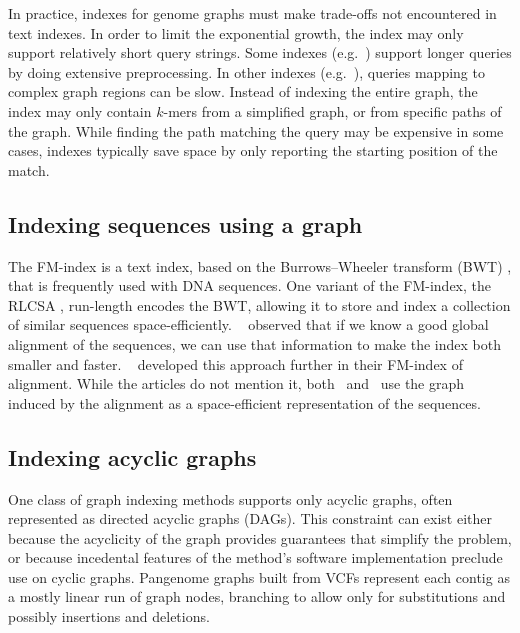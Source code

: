 In practice, indexes for genome graphs must make trade-offs not encountered in text indexes.
In order to limit the exponential growth, the index may only support relatively short query strings.
Some indexes (e.g.\ \cite{Siren_2014}) support longer queries by doing extensive preprocessing.
In other indexes (e.g.\ \cite{Thachuk_2013,Huang_2013,Maciuca_2016}), queries mapping to complex graph regions can be slow.
Instead of indexing the entire graph, the index may only contain $k$-mers from a simplified graph, or from specific paths of the graph.
While finding the path matching the query may be expensive in some cases, indexes typically save space by only reporting the starting position of the match.

\subsection{Indexing sequences using a graph}

The FM-index \cite{Ferragina_2005} is a text index, based on the Burrows--Wheeler transform (BWT) \cite{Burrows_1994}, that is frequently used with DNA sequences.
One variant of the FM-index, the RLCSA \cite{Maekinen_2010}, run-length encodes the BWT, allowing it to store and index a collection of similar sequences space-efficiently.
\citeauthor{Huang_2010}\ \cite{Huang_2010} observed that if we know a good global alignment of the sequences, we can use that information to make the index both smaller and faster.
\citeauthor{Na_2016}\ \cite{Na_2016,Na_2018} developed this approach further in their FM-index of alignment.
While the articles do not mention it, both \citeauthor{Huang_2010}\ and \citeauthor{Na_2016}\ use the graph induced by the alignment as a space-efficient representation of the sequences.

\subsection{Indexing acyclic graphs}

One class of graph indexing methods supports only acyclic graphs, often represented as directed acyclic graphs (DAGs).
This constraint can exist either because the acyclicity of the graph provides guarantees that simplify the problem, or because incedental features of the method's software implementation preclude use on cyclic graphs.
Pangenome graphs built from VCFs represent each contig as a mostly linear run of graph nodes, branching to allow only for substitutions and possibly insertions and deletions.

